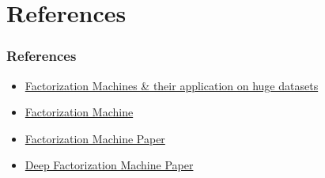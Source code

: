 \documentclass{beamer}
\begin{document}
\section{References}
\begin{frame}
	\frametitle{References}
	\begin{itemize}
		\item \href{https://www.analyticsvidhya.com/blog/2018/01/factorization-machines/}{Factorization Machines \& their application on huge datasets}
		\item \href{http://berwynzhang.com/2017/01/22/machine_learning/Factorization_Machines/}{Factorization Machine}		
		\item \href{https://www.csie.ntu.edu.tw/~b97053/paper/Rendle2010FM.pdf}{Factorization Machine Paper}
		\item \href{https://arxiv.org/pdf/1703.04247.pdf}{Deep Factorization Machine Paper}
	\end{itemize}
\end{frame}
\end{document}

